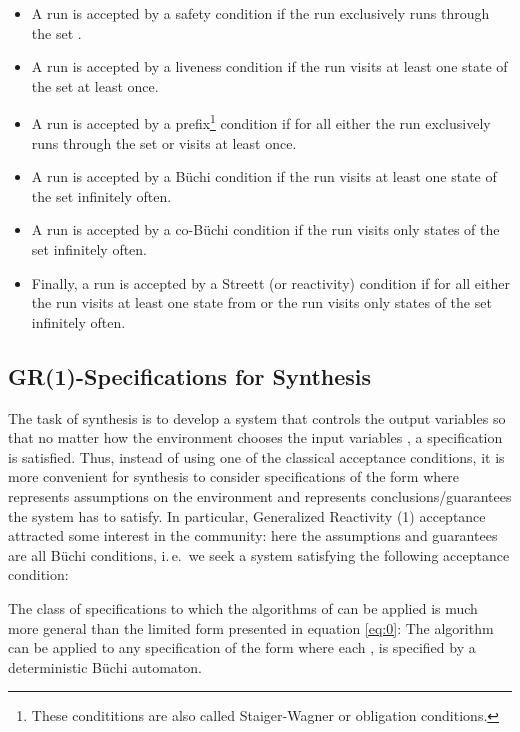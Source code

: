 \documentclass[submission,copyright,creativecommons]{eptcs}
\newcommand{\ie}{i.\,e.~}
\begin{document}
\begin{itemize}
\item A run is accepted by a safety condition  if the run exclusively runs through the set .
\item A run is accepted by a liveness condition  if the run visits at least one state of the set  at least once.
\item A run is accepted by a prefix\footnote{These condititions are also called Staiger-Wagner or obligation conditions.} condition
  if for all  either the run exclusively runs through the set  or visits  at least once.
\item A run is accepted by a Büchi condition   if the run visits at least one state of the set  infinitely often.
\item A run is accepted by a co-Büchi condition   if the run visits only states of the set  infinitely often.
\item Finally, a run is accepted by a Streett (or reactivity) condition  if for all  either the run visits at least one state from  or the run visits only states of the set  infinitely often. 
\end{itemize}












\subsection{GR(1)-Specifications for \texorpdfstring{\LTL{}}{LTL} Synthesis }
The task of \LTL{} synthesis is to develop a system that controls the output variables  so that no matter how the environment chooses the input variables , a \LTL{} specification is satisfied. Thus, instead of using one of the classical acceptance conditions, it is more convenient for synthesis to consider specifications of the form  where  represents assumptions on the environment and  represents conclusions/guarantees the system has to satisfy. In particular, Generalized Reactivity (1) acceptance \cite{BGJP07,BGJP07a,JGWB07,PiPS06} attracted some interest in the community: here the assumptions and guarantees are all Büchi conditions, \ie we seek a system satisfying the following
acceptance condition:



\noindent The class of specifications to which the algorithms of \cite{BGJP07,BGJP07a,JGWB07,PiPS06} can be applied is much more general than the limited form presented in equation \ref{eq:0}: The algorithm can be applied to any specification of the form  where each ,  is specified by a deterministic Büchi automaton.
\end{document}
